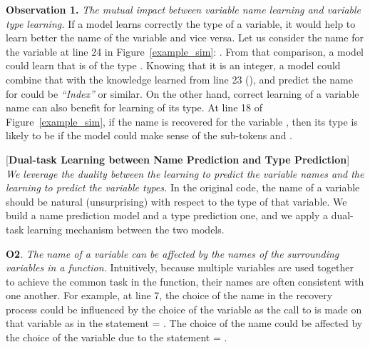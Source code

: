 \vspace{1pt} \textbf{Observation 1.} {\em The mutual impact between
  variable name learning and variable type learning.} If a model
learns correctly the type of a variable, it would help to learn better
the name of the variable and vice versa. Let us consider the name
 for the variable  at line 24 in
Figure~\ref{example_sim}: . From that comparison, a
model could learn that  is of the type . Knowing
that it is an integer, a model could combine that with the knowledge
learned from line 23 (), and predict the
name for  could be {\em ``Index''} or similar. On
the other hand, correct learning of a variable name can also benefit
for learning of its type. At line 18 of Figure~\ref{example_sim}, if
the name  is recovered for the variable
, then its type is likely to be  if the model could
make sense of the sub-tokens  and .

\vspace{1pt}  [{\bf Dual-task Learning
    between Name Prediction and Type Prediction}] {\em We leverage the
  duality between the learning to predict the variable names and the
  learning to predict the variable types.} In the original code, the
name of a variable should be natural (unsurprising) with respect to
the type of that variable. We build a name prediction model and a type
prediction one, and we apply a dual-task learning mechanism between
the two models.

\textbf{O2}. {\em The name of a variable can be affected by the names
  of the surrounding variables in a function.} Intuitively, because
multiple variables are used together to achieve the common task in the
function, their names are often consistent with one another. For
example, at line 7, the choice of the name  in the
recovery process could be influenced by the choice of the variable
 as the call to  is made on that
variable as in the statement  =
. The choice of the name
 could be affected by the choice of the
variable  due to the statement  =
.

